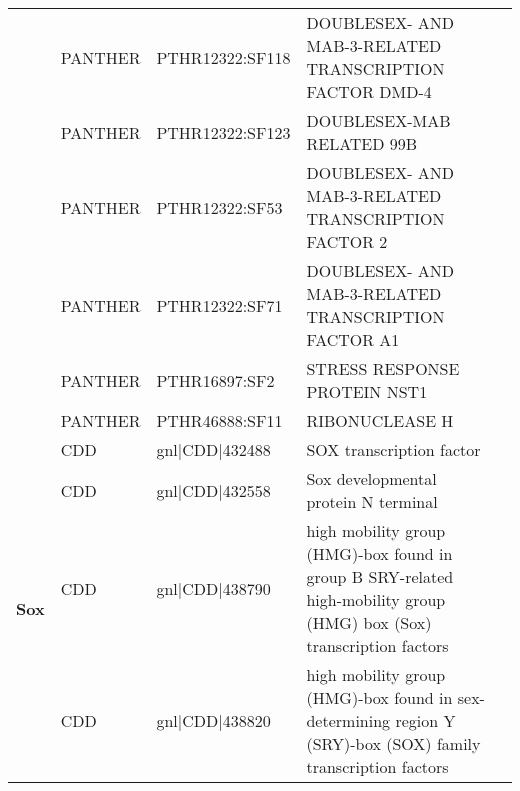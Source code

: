 \documentclass[../main.tex]{subfiles}
\begin{document}
\begin{landscape}
\begin{longtable}{@{}cllll@{}}
		                                & PANTHER              & PTHR12322:SF118 & DOUBLESEX- AND MAB-3-RELATED TRANSCRIPTION FACTOR DMD-4                                                                                      & \\
		                                & PANTHER              & PTHR12322:SF123 & DOUBLESEX-MAB RELATED 99B                                                                                                                    & \\
		                                & PANTHER              & PTHR12322:SF53  & DOUBLESEX- AND MAB-3-RELATED TRANSCRIPTION FACTOR 2                                                                                          & \\
		                                & PANTHER              & PTHR12322:SF71  & DOUBLESEX- AND MAB-3-RELATED TRANSCRIPTION FACTOR A1                                                                                         & \\
		                                & PANTHER              & PTHR16897:SF2   & STRESS RESPONSE PROTEIN NST1                                                                                                                 & \\
		                                & PANTHER              & PTHR46888:SF11  & RIBONUCLEASE H                                                                                                                               & \\* \midrule
		\multirow{29}{*}{\textbf{Sox}}  & CDD                  & gnl|CDD|432488  & SOX transcription factor                                                                                                                     & \\
		                                & CDD                  & gnl|CDD|432558  & Sox developmental protein N terminal                                                                                                         & \\
		                                & CDD                  & gnl|CDD|438790  & high mobility group (HMG)-box found in group B SRY-related high-mobility group (HMG) box (Sox) transcription factors                         & \\
		                                & CDD                  & gnl|CDD|438820  & high mobility group (HMG)-box found in sex-determining region Y (SRY)-box (SOX) family transcription factors                                 & \\

\end{longtable}
\end{landscape}
\end{document}
